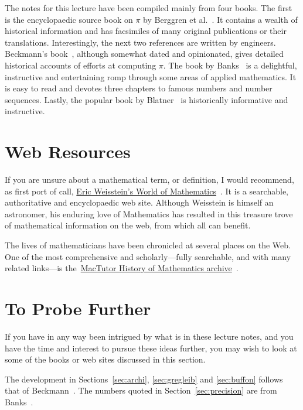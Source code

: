\documentclass[11pt,a4paper,onecolumn]{article}
\begin{document}
The notes for this lecture have been compiled mainly from four books. 
The first is the encyclopaedic source book on $\pi$ by Berggren et
al.~\cite{pi_source}.  It contains a wealth of historical information
and has facsimiles of many original publications or their
translations.  Interestingly, the next two references are written by
engineers.  Beckmann's book~\cite{beck71}, although somewhat dated and
opinionated, gives detailed historical accounts of efforts at computing
$\pi$.  The book by Banks~\cite{banks99} is a delightful, instructive
and entertaining romp through some areas of applied mathematics.  It is
easy to read and  devotes three chapters to famous numbers and number
sequences.  Lastly, the popular book by Blatner~\cite{blat97} is
historically informative and instructive.

\section{Web Resources}

If you are unsure about a mathematical term, or definition, I would
recommend, as first port of call,
\href{http://mathworld.wolfram.com/}{Eric Weisstein's World of
Mathematics}~\cite{mathworld}.  It is a searchable, authoritative and
encyclopaedic web site.  Although Weisstein is himself an astronomer,
his enduring love of Mathematics has resulted in this treasure trove of
mathematical information on the web, from which all can benefit.

The lives of mathematicians have been chronicled at several places on
the Web.  One of the most comprehensive and scholarly---fully
searchable, and with many related links---is
the~\href{http://www-history.mcs.st-andrews.ac.uk/history/index.html}%
{MacTutor History of Mathematics archive}~\cite{mactutor_history}. 

\section{To Probe Further}

If you have in any way been intrigued by what is in these lecture notes,
and you have the time and interest to pursue these ideas further, you
may wish to look at some of the books or web sites discussed in this
section.

The development in Sections~\ref{sec:archi}, \ref{sec:gregleib} and \ref{sec:buffon} follows that of Beckmann~\cite{beck71}.  The numbers quoted in Section~\ref{sec:precision} are from Banks~\cite{banks99}.
\end{document}
